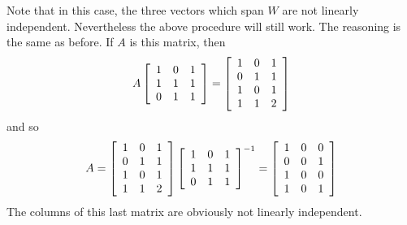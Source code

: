 \begin{solution}
Note that in this case, the three vectors which span $W$ are not linearly independent. Nevertheless the above procedure will still work.
The reasoning is the same as before. If $A$ is this matrix, then 
\begin{equation*}
A\left[
\begin{array}{rrr}
1 & 0 & 1 \\ 
1 & 1 & 1 \\ 
0 & 1 & 1
\end{array}
\right] =\left[ 
\begin{array}{rrr}
1 & 0 & 1 \\ 
0 & 1 & 1 \\ 
1 & 0 & 1 \\ 
1 & 1 & 2
\end{array}
\right]
\end{equation*}
and so 
\begin{equation*}
A=\left[
\begin{array}{rrr}
1 & 0 & 1 \\ 
0 & 1 & 1 \\ 
1 & 0 & 1 \\ 
1 & 1 & 2
\end{array}
\right] \left[ 
\begin{array}{rrr}
1 & 0 & 1 \\ 
1 & 1 & 1 \\ 
0 & 1 & 1
\end{array}
\right] ^{-1}=\left[ 
\begin{array}{rrr}
1 & 0 & 0 \\ 
0 & 0 & 1 \\ 
1 & 0 & 0 \\ 
1 & 0 & 1
\end{array}
\right]
\end{equation*}
The columns of this last matrix are obviously not linearly independent.
\end{solution}